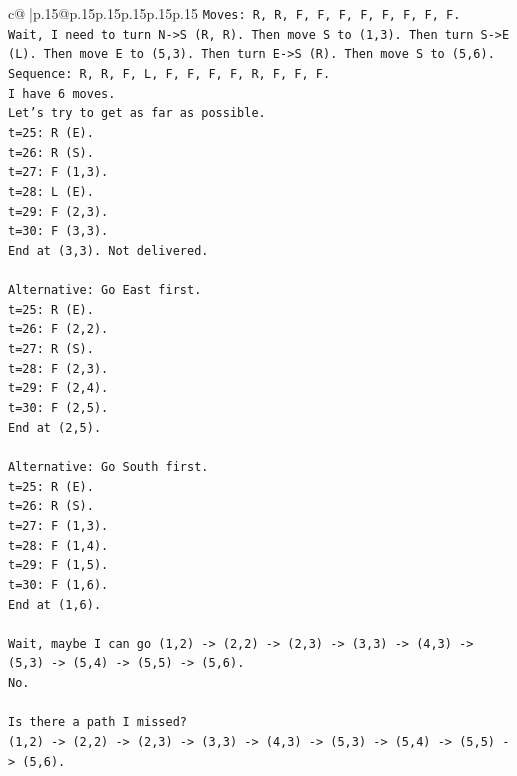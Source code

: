 \documentclass{article}
\begin{document}
{\begin{supertabular}{c@{$\;$}|p{.15\linewidth}@{}p{.15\linewidth}p{.15\linewidth}p{.15\linewidth}p{.15\linewidth}p{.15\linewidth}}
{{{\texttt{Moves: R, R, F, F, F, F, F, F, F, F.} \\
\texttt{Wait, I need to turn N{-}>S (R, R). Then move S to (1,3). Then turn S{-}>E (L). Then move E to (5,3). Then turn E{-}>S (R). Then move S to (5,6).} \\
\texttt{Sequence: R, R, F, L, F, F, F, F, R, F, F, F.} \\
\texttt{I have 6 moves.} \\
\texttt{Let's try to get as far as possible.} \\
\texttt{t=25: R (E).} \\
\texttt{t=26: R (S).} \\
\texttt{t=27: F (1,3).} \\
\texttt{t=28: L (E).} \\
\texttt{t=29: F (2,3).} \\
\texttt{t=30: F (3,3).} \\
\texttt{End at (3,3). Not delivered.} \\
\\ 
\texttt{Alternative: Go East first.} \\
\texttt{t=25: R (E).} \\
\texttt{t=26: F (2,2).} \\
\texttt{t=27: R (S).} \\
\texttt{t=28: F (2,3).} \\
\texttt{t=29: F (2,4).} \\
\texttt{t=30: F (2,5).} \\
\texttt{End at (2,5).} \\
\\ 
\texttt{Alternative: Go South first.} \\
\texttt{t=25: R (E).} \\
\texttt{t=26: R (S).} \\
\texttt{t=27: F (1,3).} \\
\texttt{t=28: F (1,4).} \\
\texttt{t=29: F (1,5).} \\
\texttt{t=30: F (1,6).} \\
\texttt{End at (1,6).} \\
\\ 
\texttt{Wait, maybe I can go (1,2) {-}> (2,2) {-}> (2,3) {-}> (3,3) {-}> (4,3) {-}> (5,3) {-}> (5,4) {-}> (5,5) {-}> (5,6).} \\
\texttt{No.} \\
\\ 
\texttt{Is there a path I missed?} \\
\texttt{(1,2) {-}> (2,2) {-}> (2,3) {-}> (3,3) {-}> (4,3) {-}> (5,3) {-}> (5,4) {-}> (5,5) {-}> (5,6).} \\
}}}
\end{supertabular}}
\end{document}
